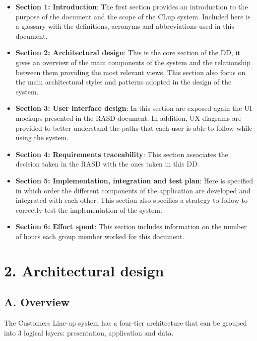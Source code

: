 \begin{itemize}
\item 
    \textbf{Section 1: Introduction}: The first section provides an introduction to the purpose of the document and the scope of the CLup system. Included here is a glossary with the definitions, acronyms and abbreviations used in this document.
\item 
    \textbf{Section 2: Architectural design}: This is the core section of the DD, it gives an overview of the main components of the system and the relationship between them providing the most relevant views. This section also focus on the main architectural styles and patterns adopted in the design of the system.
\item 
    \textbf{Section 3: User interface design}: In this section are exposed again the UI mockups presented in the RASD document. In addition, UX diagrams are provided to better understand the paths that each user is able to follow while using the system.
\item 
    \textbf{Section 4: Requirements traceability}: This section associates the decision taken in the RASD with the ones taken in this DD.
\item 
    \textbf{Section 5: Implementation, integration and test plan}: Here is specified in which order the different components of the application are developed and integrated with each other. This section also specifies a strategy to follow to correctly test the implementation of the system.
\item 
    \textbf{Section 6: Effort spent}: This section includes information on the number of hours each group member worked for this document.
\end{itemize}

\chapter{2. Architectural design}

\section{A. Overview}

The Customers Line-up system has a four-tier architecture that can be grouped into 3 logical layers: presentation, application and data.

